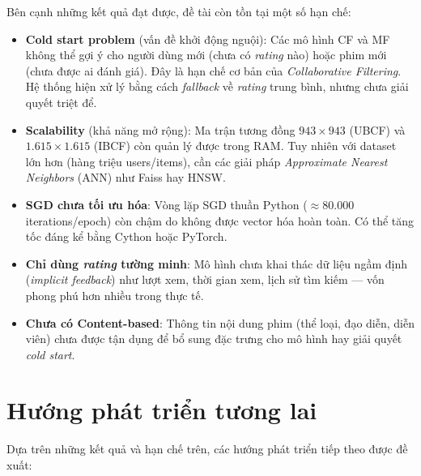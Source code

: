 \documentclass[../BTL.tex]{subfiles}
\begin{document}
Bên cạnh những kết quả đạt được, đề tài còn tồn tại một số hạn chế:

\begin{itemize}[itemsep=0.5em]
    \item \textbf{Cold start problem} (vấn đề khởi động nguội): Các mô hình
    CF và MF không thể gợi ý cho người dùng mới (chưa có
    \textit{rating} nào) hoặc phim mới (chưa được ai đánh giá). Đây là
    hạn chế cơ bản của \textit{Collaborative Filtering}. Hệ thống hiện xử
    lý bằng cách \textit{fallback} về \textit{rating} trung bình,
    nhưng chưa giải quyết triệt để.

    \item \textbf{Scalability} (khả năng mở rộng): Ma trận tương đồng
    $943 \times 943$ (UBCF) và $1.615 \times 1.615$ (IBCF) còn quản lý
    được trong RAM. Tuy nhiên với dataset lớn hơn (hàng triệu users/items),
    cần các giải pháp \textit{Approximate Nearest Neighbors} (ANN) như
    Faiss hay HNSW.

    \item \textbf{SGD chưa tối ưu hóa}: Vòng lặp SGD thuần Python
    (${\approx}80.000$ iterations/epoch) còn chậm do không được vector hóa
    hoàn toàn. Có thể tăng tốc đáng kể bằng Cython hoặc PyTorch.

    \item \textbf{Chỉ dùng \textit{rating} tường minh}: Mô hình chưa khai
    thác dữ liệu ngầm định (\textit{implicit feedback}) như lượt xem, thời
    gian xem, lịch sử tìm kiếm — vốn phong phú hơn nhiều trong thực tế.

    \item \textbf{Chưa có Content-based}: Thông tin nội dung phim (thể loại,
    đạo diễn, diễn viên) chưa được tận dụng để bổ sung đặc trưng cho mô
    hình hay giải quyết \textit{cold start}.
\end{itemize}

\section{Hướng phát triển tương lai}
\label{section:4.3}

Dựa trên những kết quả và hạn chế trên, các hướng phát triển tiếp theo được
đề xuất:
\end{document}
